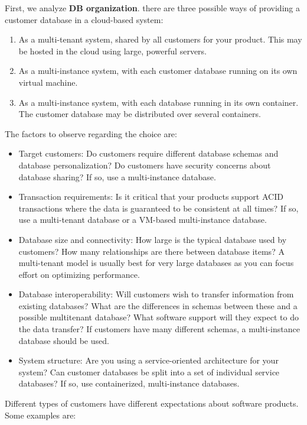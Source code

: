 \documentclass[10pt,a4paper]{report}
\begin{document}
First, we analyze \textbf{DB organization}. there are three possible ways of providing a customer database in a cloud-based system:
\begin{enumerate}
	\item  As a multi-tenant system,
	shared by all customers for
	your product. This may be
	hosted in the cloud using large,
	powerful servers.
	\item As a multi-instance system,
	with each customer database
	running on its own virtual
	machine.
	\item As a multi-instance system,
	with each database running in
	its own container. The
	customer database may be
	distributed over several
	containers.
\end{enumerate}
The factors to observe regarding the choice are:
\begin{itemize}
	\item Target customers: 
	Do customers require different database schemas and database personalization? Do customers
	have security concerns about database sharing? If so, use a multi-instance database.
	\item Transaction requirements:
	Is it critical that your products support ACID transactions where the data is guaranteed to be
	consistent at all times? If so, use a multi-tenant database or a VM-based multi-instance database.
	\item Database size and connectivity:
	How large is the typical database used by customers? How many relationships are there between
	database items? A multi-tenant model is usually best for very large databases as you can focus
	effort on optimizing performance.
	\item Database interoperability:
	Will customers wish to transfer information from existing databases? What are the differences in
	schemas between these and a possible multitenant database? What software support will they
	expect to do the data transfer? If customers have many different schemas, a multi-instance
	database should be used.
	\item System structure:
	Are you using a service-oriented architecture for your system? Can customer databases be split
	into a set of individual service databases? If so, use containerized, multi-instance databases.
\end{itemize}
Different types of customers have different expectations about
software products. Some examples are:
\end{document}
